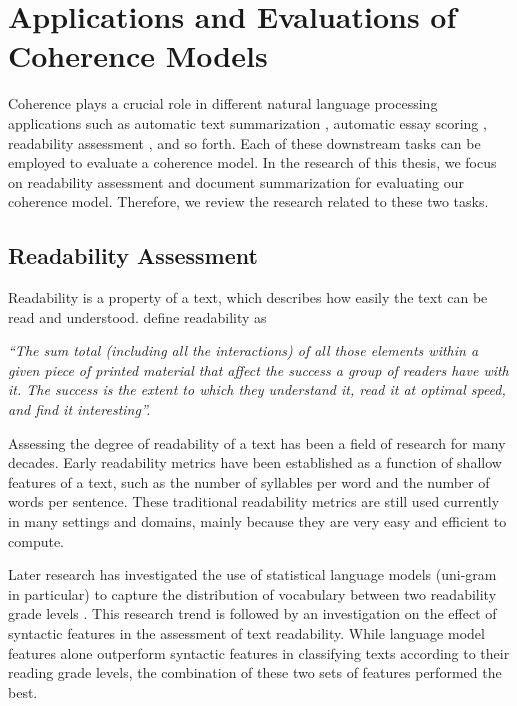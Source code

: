 \section{Applications and Evaluations of Coherence Models}
\label{sec:rel-coh-applications}

Coherence plays a crucial role in different natural language processing applications such as automatic text summarization \cite{celikyilmaz11,linzhiheng12,fengvanessawei12a}, automatic essay scoring \cite{miltsakaki04a,higgins04,burstein10}, readability assessment \cite{pitler08,wangxinhao13}, and so forth.  
Each of these downstream tasks can be employed to evaluate a coherence model. 
In the research of this thesis, we focus on readability assessment and document summarization for evaluating our coherence model. 
Therefore, we review the research related to these two tasks. 


\subsection{Readability Assessment}

Readability is a property of a text, which describes how easily the text can be read and understood.  
 define readability as 

\emph{``The sum total (including all the interactions) of all those elements within a given piece of printed material that affect the success a group of readers have with it. 
The success is the extent to which they understand it, read it at optimal speed, and find it interesting''.}

Assessing the degree of readability of a text has been a field of research for many decades. 
Early readability metrics \cite{flesch48,kincaid75} have been established as a function of shallow features of a text, such as the number of syllables per word and the number of words per sentence. 
These traditional readability metrics are still used currently in many settings and domains, mainly because they are very easy and efficient to compute.  

Later research has investigated the use of statistical language models 
(uni-gram in particular) to capture the distribution of vocabulary between two readability grade levels
\cite{siluo01,collins-thompson04}. 
This research trend is followed by an investigation on the effect of syntactic features \cite{schwarm05,heilman07,petersen09} in the assessment of text readability. 
While language model features alone outperform syntactic features in classifying texts according to their reading grade levels, the combination of these two sets of features performed the best. 

